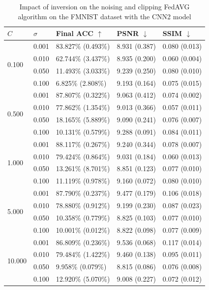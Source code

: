 \documentclass[conference,compsoc]{IEEEtran}
\begin{document}
\begin{table}[H]
\centering
\caption{Impact of inversion on the noising and clipping FedAVG algorithm on the FMNIST dataset with the CNN2 model}
\label{table:dp_fmnist_cnn2}
\begin{tabular}{lllll}
\hline
$C$ & $\sigma$ & \textbf{Final ACC} $\uparrow$ & \textbf{PSNR} $\downarrow$ & \textbf{SSIM} $\downarrow$ \\
\hline
\multirow{4}{*}{0.100} & 0.001 & 83.827\% (0.493\%) & 8.931 (0.387) & 0.080 (0.013) \\
& 0.010 & 62.744\% (3.437\%) & 8.935 (0.200) & 0.060 (0.004) \\
& 0.050 & 11.493\% (3.033\%) & 9.239 (0.250) & 0.080 (0.010) \\
& 0.100 & 6.825\% (2.808\%) & 9.193 (0.164) & 0.075 (0.015) \\
\hline
\multirow{4}{*}{0.500} & 0.001 & 87.807\% (0.322\%) & 9.063 (0.412) & 0.074 (0.002) \\
& 0.010 & 77.862\% (1.354\%) & 9.013 (0.366) & 0.057 (0.011) \\
& 0.050 & 18.165\% (5.889\%) & 9.090 (0.241) & 0.076 (0.007) \\
& 0.100 & 10.131\% (0.579\%) & 9.288 (0.091) & 0.084 (0.011) \\
\hline
\multirow{4}{*}{1.000} & 0.001 & 88.117\% (0.267\%) & 9.240 (0.344) & 0.078 (0.007) \\
& 0.010 & 79.424\% (0.864\%) & 9.031 (0.184) & 0.060 (0.013) \\
& 0.050 & 13.261\% (8.701\%) & 8.851 (0.123) & 0.077 (0.010) \\
& 0.100 & 11.119\% (0.978\%) & 9.160 (0.072) & 0.080 (0.010) \\
\hline
\multirow{4}{*}{5.000} & 0.001 & 87.790\% (0.237\%) & 9.477 (0.179) & 0.106 (0.018) \\
& 0.010 & 78.880\% (0.912\%) & 9.199 (0.230) & 0.087 (0.023) \\
& 0.050 & 10.358\% (0.779\%) & 8.825 (0.103) & 0.077 (0.010) \\
& 0.100 & 10.001\% (0.012\%) & 8.822 (0.098) & 0.077 (0.009) \\
\hline
\multirow{4}{*}{10.000} & 0.001 & 86.809\% (0.236\%) & 9.536 (0.068) & 0.117 (0.014) \\
& 0.010 & 79.484\% (1.422\%) & 9.460 (0.138) & 0.095 (0.011) \\
& 0.050 & 9.958\% (0.079\%) & 8.815 (0.086) & 0.076 (0.008) \\
& 0.100 & 12.920\% (5.070\%) & 9.008 (0.227) & 0.072 (0.012) \\
\hline
\end{tabular}
\end{table}
\end{document}
